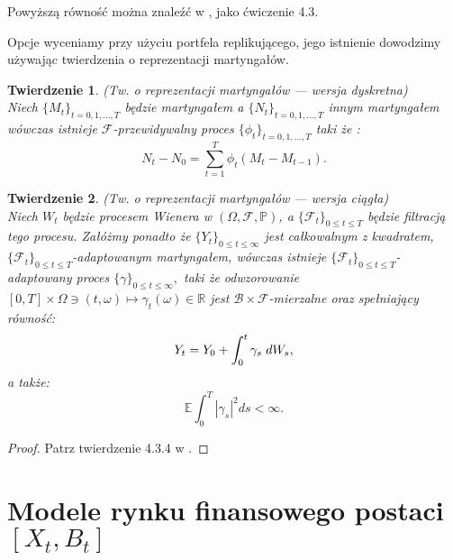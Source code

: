 \documentclass[11pt]{report}
\newtheorem{tw}{Twierdzenie}[chapter]
\begin{document}
Powyższą równość można znaleźć w \cite{okse}, jako ćwiczenie 4.3. 
\vspace{1cm}

Opcje wyceniamy przy użyciu portfela replikującego, jego istnienie dowodzimy używając twierdzenia o reprezentacji martyngałów. 

\vspace{0.3cm}
\begin{tw}{(Tw. o reprezentacji martyngałów --- wersja dyskretna)} 
$ $ \\ 
Niech $\{ M_t \}_{t=0,1,...,T}$ będzie martyngałem a $\{ N_t \}_{t=0,1,...,T}$ innym martyngałem wówczas istnieje $\mathscr{F}$-przewidywalny proces $\{ \phi_t \}_{t=0,1,...,T}$ taki że :
\begin{equation}
N_t - N_0 = \sum_{t=1}^{T} \phi_t(M_{t}-M_{t-1}). 
\end{equation}

\end{tw}

\begin{tw}{(Tw. o reprezentacji martyngałów --- wersja ciągła)} \\
Niech $W_t$ będzie procesem Wienera w $(\Omega,\mathscr{F},\mathbb{P})$, a $\{\mathscr{F}_t \}_{0 \le t \le T}$ będzie filtracją tego procesu. Załóżmy ponadto że $ \{ Y_t \}_{0 \le t \le \infty}$ jest całkowalnym z kwadratem, $\{\mathscr{F}_t \}_{0 \le t \le T}$-adaptowanym martyngałem, wówczas istnieje $\{\mathscr{F}_t \}_{0 \le t \le T}$-adaptowany proces $\{ \gamma \}_{ 0 \le t \le \infty},$ taki że odwzorowanie \\ $[0,T] \times \Omega \ni (t,\omega) \mapsto \gamma_t(\omega) \in \mathbb{R}$ jest $\mathscr{B} \times \mathscr{F}$-mierzalne oraz spełniający równość:
\begin{equation*}
Y_t = Y_0 + \int_0^{t} \gamma_s \hspace{0,1 cm} dW_s,
\end{equation*} a także:
\begin{equation}
\mathbb{E} \int_0^{T} |\gamma_s|^2 ds < \infty.
\end{equation}
\end{tw}
\begin{proof}
Patrz twierdzenie 4.3.4 w \cite{okse}.
\end{proof}

\section{Modele rynku finansowego postaci $[X_t, B_t]$}
\end{document}
